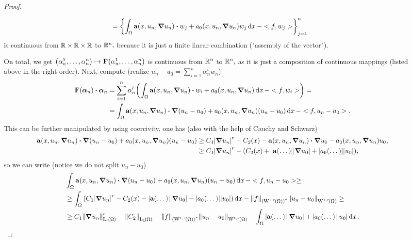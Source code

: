 \documentclass{article}
\begin{document}
\begin{proof}
\begin{itemize}
\begin{align*}
				&= \qty{\int_{\Omega}\vb{a}\qty(x, u_n, \grad u_n) \vdot w_j + a_0\qty(x, u_n, \grad u_n) w_j\dd{x} - <f, w_j>}_{j=1}^n
			\end{align*}
			is continuous from ${\mathbb R} \times {\mathbb R} \times {\mathbb R}$ to ${\mathbb R}^{n},$ because it is just a finite linear combination ("assembly of the vector").
	\end{itemize}
	On total, we get $\qty(\alpha_n^1, \dots, \alpha_n^n) \mapsto \vb{F}\qty(\alpha_n^1, \dots, \alpha_n^n)$ is continuous from ${\mathbb R}^{n}$ to ${\mathbb R}^{n},$ as it is just a composition of continuous mappings (listed above in the right order). Next, compute (realize $u_n - u_0 = \sum_{i=1}^n \alpha^i_n w_n$)
	\begin{align*}
		\vb{F}\qty(\vb*{\alpha}_n) \vdot \vb*{\alpha}_n  &= \sum_{i=1}^n \alpha^i_n \qty(\int_{\Omega}\vb{a}\qty(x, u_n, \grad u_n) \vdot w_i + a_0\qty(x, u_n, \grad u_n)\dd{x} - <f,w_i>) =\\
								 &= \int_{\Omega}\vb{a}\qty(x, u_n, \grad u_n) \vdot \grad\qty(u_n - u_0) + a_0\qty(x, u_n, \grad u_n) \qty(u_n - u_0)\dd{x} - <f, u_n - u_0>.
	\end{align*}
	This can be further manipulated by using coercivity, one has (also with the help of Cauchy and Schwarz)
	\begin{align*}
		\vb{a}\qty(x, u_n, \grad u_n) \vdot \grad\qty(u_n - u_0) + a_0\qty(x, u_n, \grad u_n) \qty(u_n - u_0) &\geq C_1\abs{\grad u_n}^r - C_2(x) - \vb{a}\qty(x, u_n, \grad u_n) \vdot \grad u_0 - a_0\qty(x, u_n, \grad u_n) u_0, \\
														      &\geq C_1\abs{\grad u_n}^r-\qty(C_2(x) + \abs{\vb{a}(\dots)}\abs{\grad u_0} + \abs{a_0(\dots)}\abs{u_0}),
	\end{align*}
	so we can write (notice we do not split $u_n - u_0$)
	\begin{align*}
								 &\int_{\Omega}\vb{a}\qty(x, u_n, \grad u_n) \vdot \grad\qty(u_n - u_0) + a_0\qty(x, u_n, \grad u_n) \qty(u_n - u_0)\dd{x} - <f, u_n - u_0> \geq \\
								 & \geq \int_{\Omega}\qty(C_1 \abs{\grad u_n}^r -C_2(x) - \abs{\vb{a}(\dots)}\abs{\grad u_0} - \abs{a_0(\dots)}\abs{u_0})\dd{x} - \norm{f}_{\qty(\WkpSet[1][r]{\Omega})^{*}}\norm{u_n-u_0}_{\WkpSet[1][r]{\Omega}}\geq \\
								 &\geq C_1 \norm{\grad u_n}_{\LpSet[r]{\Omega}}^r - \norm{C_2}_{\LpSet[1]{\Omega}} -  \norm{f}_{\qty(\WkpSet[1][r]{\Omega})^{*}}\norm{u_n-u_0}_{\WkpSet[1][r]{\Omega}} - \int_{\Omega}\abs{\vb{a}(\dots)}\abs{\grad u_0}+\abs{a_0(\dots)}\abs{u_0}\dd{x}.
	\end{align*}

\end{proof}
\end{document}
